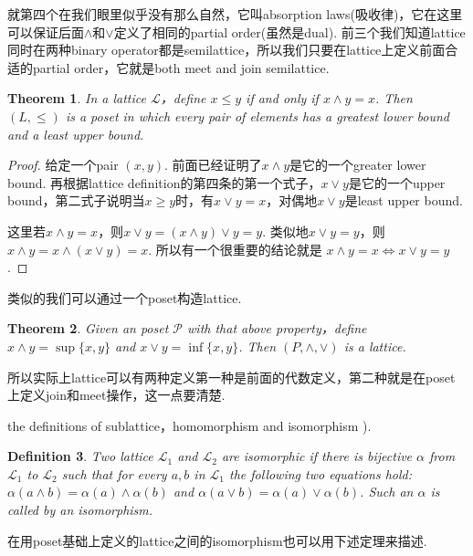 \documentclass{article}
\newtheorem{theorem}{Theorem}[section]
\newtheorem{definition}[theorem]{Definition}
\newcommand\lattice{\mathcal{L}}
\begin{document}
{\color{blue} 就第四个在我们眼里似乎没有那么自然，它叫absorption laws(吸收律)，它在这里可以保证后面$\wedge$和$\vee$定义了相同的partial order(虽然是dual). 前三个我们知道lattice同时在两种binary operator都是semilattice，所以我们只要在lattice上定义前面合适的partial order，它就是both meet and join semilattice}. 

\begin{theorem}
\rm In a lattice $\lattice$，define $x \leq y$ if and only if $x \wedge y = x$. Then $(L,\leq)$ is a poset in which every pair of elements has a greatest lower bound and a least upper bound.  
\end{theorem}

\begin{proof}
给定一个pair $(x,y)$. 前面已经证明了$x \wedge y$是它的一个greater lower bound. 再根据lattice definition的第四条的第一个式子，$x \vee y$是它的一个upper bound，第二式子说明当$x \geq y$时，有$x \vee y = x$，对偶地$x \vee y$是least upper bound. 

这里若$x \wedge y = x$，则$x \vee y = (x \wedge y) \vee y = y$.  类似地$x \vee y = y$，则$x \wedge y = x \wedge (x \vee y) = x$.  所以有一个很重要的结论就是{\color{blue} $x \wedge y = x \iff x \vee y = y$}.
\end{proof}

{\color{red} 类似的我们可以通过一个poset构造lattice}.

\begin{theorem}
\rm Given an poset $\mathcal{P}$ with that above property，define $x \wedge y = \sup\{x,y\}$ and $x \vee y = \inf\{x,y\}$. Then $(P,\wedge,\vee)$ is a lattice.
\end{theorem}


{\color{blue} 所以实际上lattice可以有两种定义第一种是前面的代数定义，第二种就是在poset上定义join和meet操作，这一点要清楚}.


{\color{red} the definitions of sublattice，homomorphism and isomorphism )}.

\begin{definition}
\rm Two lattice $\lattice_1$ and $\lattice_2$ are {\color{red} isomorphic} if there is {\color{red} bijective} $\alpha$ from $\lattice_1$ to $\lattice_2$ such that for every $a,b$ in $\lattice_1$ the following two equations hold: $\alpha(a \wedge b) = \alpha(a) \wedge \alpha(b)$ and $\alpha(a \vee b) = \alpha(a) \vee \alpha(b)$. Such an $\alpha$ is called by an {\color{red} isomorphism}.  
\end{definition}

{\color{red} 在用poset基础上定义的lattice之间的isomorphism也可以用下述定理来描述}.
\end{document}

